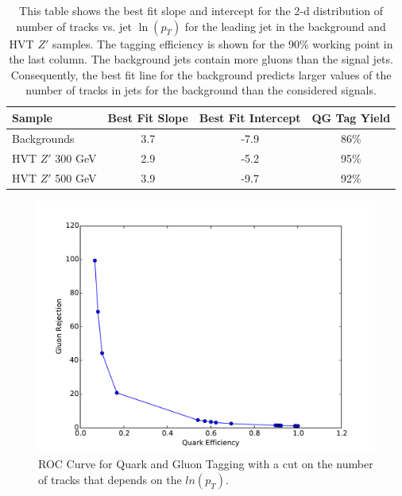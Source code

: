\begin{table}
\begin{tabular}{|l|c|c|c|}
\hline
Sample & Best Fit Slope & Best Fit Intercept & QG Tag Yield \\\hline
Backgrounds & 3.7 & -7.9 & 86\% \\\hline
HVT $Z'$ 300 GeV &  2.9 & -5.2 & 95\% \\\hline
HVT $Z'$ 500 GeV & 3.9 & -9.7 & 92\% \\\hline
\end{tabular}
\caption{This table shows the best fit slope and intercept for the 2-d distribution of number of tracks vs. jet $\ln(p_{T})$ for the leading jet in the background and HVT $Z'$ samples. The tagging efficiency is shown for the 90\% working point in the last column. The background jets contain more gluons than the signal jets. Consequently, the best fit line for the background predicts larger values of the number of tracks in jets for the background than the considered signals.}
\label{tbl:qgtable}
\end{table}

\begin{figure}[h!]
  \centering
  \includegraphics[width=\hsize]{figures/QGT/finalroc.pdf}
  \caption{ROC Curve for Quark and Gluon Tagging with a cut on the number of tracks that depends on the $ln(p_{T})$.}
  \label{fig:quark_gluon_roc}
\end{figure}
\FloatBarrier


